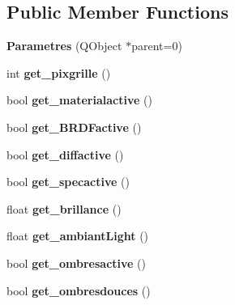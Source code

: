 \subsection*{Public Member Functions}
\begin{DoxyCompactItemize}
\item 
\hypertarget{class_parametres_a6a6a5bb49949914fdfe977178ebd953a}{
{\bfseries Parametres} (QObject $\ast$parent=0)}
\label{class_parametres_a6a6a5bb49949914fdfe977178ebd953a}

\item 
\hypertarget{class_parametres_a00cbd2fea9fcc5d9288cfaf24ff17a49}{
int {\bfseries get\_\-pixgrille} ()}
\label{class_parametres_a00cbd2fea9fcc5d9288cfaf24ff17a49}

\item 
\hypertarget{class_parametres_a0e31b234e6bc1959c8f6f16f5786214b}{
bool {\bfseries get\_\-materialactive} ()}
\label{class_parametres_a0e31b234e6bc1959c8f6f16f5786214b}

\item 
\hypertarget{class_parametres_aa418f7387004508a7f07567cce4c9081}{
bool {\bfseries get\_\-BRDFactive} ()}
\label{class_parametres_aa418f7387004508a7f07567cce4c9081}

\item 
\hypertarget{class_parametres_a02303ef51a9f3942134932186815e35d}{
bool {\bfseries get\_\-diffactive} ()}
\label{class_parametres_a02303ef51a9f3942134932186815e35d}

\item 
\hypertarget{class_parametres_ad7f074c9be240e8b6b9b7ea52c900f6f}{
bool {\bfseries get\_\-specactive} ()}
\label{class_parametres_ad7f074c9be240e8b6b9b7ea52c900f6f}

\item 
\hypertarget{class_parametres_ac31e2d824e16ca40fd437edfe17bf05e}{
float {\bfseries get\_\-brillance} ()}
\label{class_parametres_ac31e2d824e16ca40fd437edfe17bf05e}

\item 
\hypertarget{class_parametres_abb90eb326ba23eaf17a5a62e3dfd1288}{
float {\bfseries get\_\-ambiantLight} ()}
\label{class_parametres_abb90eb326ba23eaf17a5a62e3dfd1288}

\item 
\hypertarget{class_parametres_a4c86c1342c7be51975c5d1c11c9a5db4}{
bool {\bfseries get\_\-ombresactive} ()}
\label{class_parametres_a4c86c1342c7be51975c5d1c11c9a5db4}

\item 
\hypertarget{class_parametres_a3ee0b77acd375580b468862aefa98688}{
bool {\bfseries get\_\-ombresdouces} ()}
\label{class_parametres_a3ee0b77acd375580b468862aefa98688}


\end{DoxyCompactItemize}
